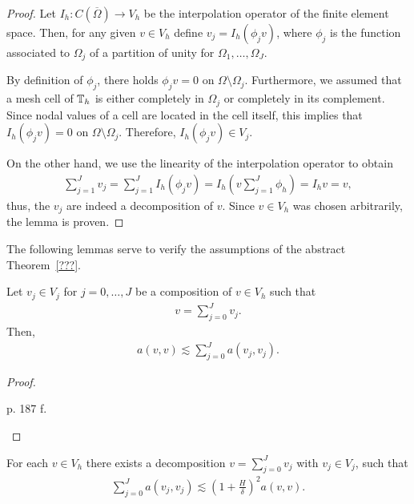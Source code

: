 \begin{proof}
  Let $I_h: C(\overline\Omega) \to V_h$ be the interpolation operator
  of the finite element space. Then, for any given $v\in V_h$ define
  $v_j = I_h(\phi_j v)$, where $\phi_j$ is the function associated to
  $\Omega_j$ of a partition of unity for $\Omega_1,\dots,\Omega_J$.
  
  By definition of $\phi_j$, there holds $\phi_j v = 0$ on
  $\Omega\setminus\Omega_j$. Furthermore, we assumed that a mesh cell
  of $\mathbb T_h$ is either completely in $\Omega_j$ or completely in its
  complement. Since nodal values of a cell are located in the cell
  itself, this implies that $I_h (\phi_j v) = 0$ on
  $\Omega\setminus\Omega_j$. Therefore, $I_h (\phi_j v) \in V_j$.
  
  On the other hand, we use the linearity of the interpolation
  operator to obtain
  \begin{gather*}
    \sum_{j=1}^J v_j = \sum_{j=1}^J I_h(\phi_j v)
    = I_h\left(v\sum_{j=1}^J \phi_h\right)
    = I_h v = v,
  \end{gather*}
  thus, the $v_j$ are indeed a decomposition of $v$. Since $v\in V_h$
  was chosen arbitrarily, the lemma is proven.
\end{proof}

\begin{intro}
  The following lemmas serve to verify the assumptions of the abstract
  Theorem~\ref{???}.
\end{intro}

\begin{lemma}
  Let $v_j\in V_j$ for $j=0,\dots,J$ be a composition of $v\in V_h$
  such that
  \begin{gather*}
    v=\sum_{j=0}^J v_j.
  \end{gather*}
  Then,
  \begin{gather}
    \label{eq:schwarz:12}
    a(v,v) \lesssim \sum_{j=0}^J a(v_j, v_j).
  \end{gather}
\end{lemma}

\begin{proof}
  \begin{todo}
    p. 187 f.
  \end{todo}
\end{proof}

\begin{lemma}
  \label{lemma:schwarz:stable-decomposition}
  For each $v\in V_h$ there exists a decomposition $v=\sum_{j=0}^J
  v_j$ with $v_j\in V_j$, such that
  \begin{gather}
    \label{eq:schwarz:13}
    \sum_{j=0}^J a(v_j, v_j)
    \lesssim \left(1+\frac H\delta\right)^2 a(v,v).
  \end{gather}
\end{lemma}

